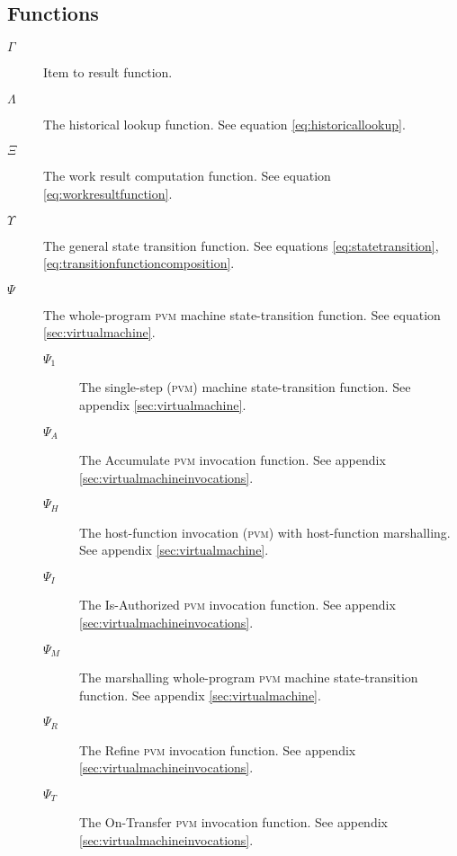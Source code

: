 \subsection{Functions}

\begin{description}
  \item[$\Gamma$] Item to result function. %
  \item[$\Lambda$] The historical lookup function. See equation \ref{eq:historicallookup}. %
  \item[$\Xi$] The work result computation function. See equation \ref{eq:workresultfunction}. %
  \item[$\Upsilon$] The general state transition function. See equations \ref{eq:statetransition}, \ref{eq:transitionfunctioncomposition}. %
  \item[$\Psi$] The whole-program \textsc{pvm} machine state-transition function. See equation \ref{sec:virtualmachine}. %
  \begin{description}
    \item[$\Psi_1$] The single-step (\textsc{pvm}) machine state-transition function. See appendix \ref{sec:virtualmachine}. %
    \item[$\Psi_A$] The Accumulate \textsc{pvm} invocation function. See appendix \ref{sec:virtualmachineinvocations}.
    \item[$\Psi_H$] The host-function invocation (\textsc{pvm}) with host-function marshalling. See appendix \ref{sec:virtualmachine}. %
    \item[$\Psi_I$] The Is-Authorized \textsc{pvm} invocation function. See appendix \ref{sec:virtualmachineinvocations}.
    \item[$\Psi_M$] The marshalling whole-program \textsc{pvm} machine state-transition function. See appendix \ref{sec:virtualmachine}. %
    \item[$\Psi_R$] The Refine \textsc{pvm} invocation function. See appendix \ref{sec:virtualmachineinvocations}.
    \item[$\Psi_T$] The On-Transfer \textsc{pvm} invocation function. See appendix \ref{sec:virtualmachineinvocations}.
  \end{description}

\end{description}
